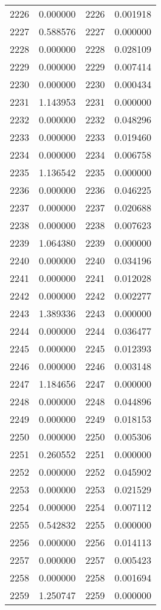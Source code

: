 \documentclass[12pt]{article}
\begin{document}
\begin{longtable}{@{}cccc@{}}
2226 & 0.000000 & 2226 & 0.001918 \\
2227 & 0.588576 & 2227 & 0.000000 \\
2228 & 0.000000 & 2228 & 0.028109 \\
2229 & 0.000000 & 2229 & 0.007414 \\
2230 & 0.000000 & 2230 & 0.000434 \\
2231 & 1.143953 & 2231 & 0.000000 \\
2232 & 0.000000 & 2232 & 0.048296 \\
2233 & 0.000000 & 2233 & 0.019460 \\
2234 & 0.000000 & 2234 & 0.006758 \\
2235 & 1.136542 & 2235 & 0.000000 \\
2236 & 0.000000 & 2236 & 0.046225 \\
2237 & 0.000000 & 2237 & 0.020688 \\
2238 & 0.000000 & 2238 & 0.007623 \\
2239 & 1.064380 & 2239 & 0.000000 \\
2240 & 0.000000 & 2240 & 0.034196 \\
2241 & 0.000000 & 2241 & 0.012028 \\
2242 & 0.000000 & 2242 & 0.002277 \\
2243 & 1.389336 & 2243 & 0.000000 \\
2244 & 0.000000 & 2244 & 0.036477 \\
2245 & 0.000000 & 2245 & 0.012393 \\
2246 & 0.000000 & 2246 & 0.003148 \\
2247 & 1.184656 & 2247 & 0.000000 \\
2248 & 0.000000 & 2248 & 0.044896 \\
2249 & 0.000000 & 2249 & 0.018153 \\
2250 & 0.000000 & 2250 & 0.005306 \\
2251 & 0.260552 & 2251 & 0.000000 \\
2252 & 0.000000 & 2252 & 0.045902 \\
2253 & 0.000000 & 2253 & 0.021529 \\
2254 & 0.000000 & 2254 & 0.007112 \\
2255 & 0.542832 & 2255 & 0.000000 \\
2256 & 0.000000 & 2256 & 0.014113 \\
2257 & 0.000000 & 2257 & 0.005423 \\
2258 & 0.000000 & 2258 & 0.001694 \\
2259 & 1.250747 & 2259 & 0.000000 \\

\end{longtable}
\end{document}
